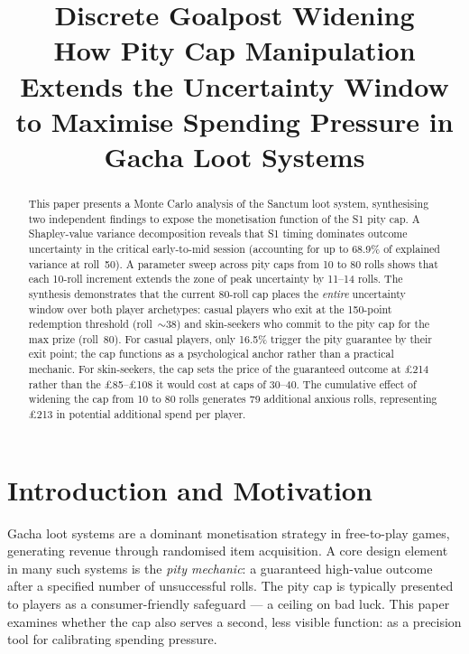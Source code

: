 \documentclass[11pt, a4paper]{article}
\title{%
    \textbf{Discrete Goalpost Widening} \\[0.4em]
    \large How Pity Cap Manipulation Extends the Uncertainty Window \\
    to Maximise Spending Pressure in Gacha Loot Systems
}
\author{\vspace{-2em}}
\date{\vspace{-2em}}
\begin{document}
\maketitle

\begin{abstract}
    This paper presents a Monte Carlo analysis of the Sanctum loot
    system, synthesising two independent findings to expose the
    monetisation function of the S1 pity cap. A Shapley-value variance
    decomposition reveals that S1 timing dominates outcome uncertainty
    in the critical early-to-mid session (accounting for up to 68.9\%
    of explained variance at roll~50). A parameter sweep across pity
    caps from 10 to 80 rolls shows that each 10-roll increment extends
    the zone of peak uncertainty by 11--14 rolls. The synthesis
    demonstrates that the current 80-roll cap places the \emph{entire}
    uncertainty window over both player archetypes: casual players
    who exit at the 150-point redemption threshold (roll~$\sim$38)
    and skin-seekers who commit to the pity cap for the max prize
    (roll~80). For casual players, only 16.5\% trigger the pity
    guarantee by their exit point; the cap functions as a
    psychological anchor rather than a practical mechanic. For
    skin-seekers, the cap sets the price of the guaranteed outcome
    at \pounds214 rather than the \pounds85--\pounds108 it would
    cost at caps of 30--40. The cumulative effect of widening the
    cap from 10 to 80 rolls generates 79 additional anxious rolls,
    representing \pounds213 in potential additional spend per player.
\end{abstract}

\tableofcontents
\newpage


\section{Introduction and Motivation}
\label{sec:intro}

Gacha loot systems are a dominant monetisation strategy in
free-to-play games, generating revenue through randomised item
acquisition. A core design element in many such systems is the
\emph{pity mechanic}: a guaranteed high-value outcome after a
specified number of unsuccessful rolls. The pity cap is typically
presented to players as a consumer-friendly safeguard --- a ceiling
on bad luck. This paper examines whether the cap also serves a
second, less visible function: as a precision tool for calibrating
spending pressure.
\end{document}
